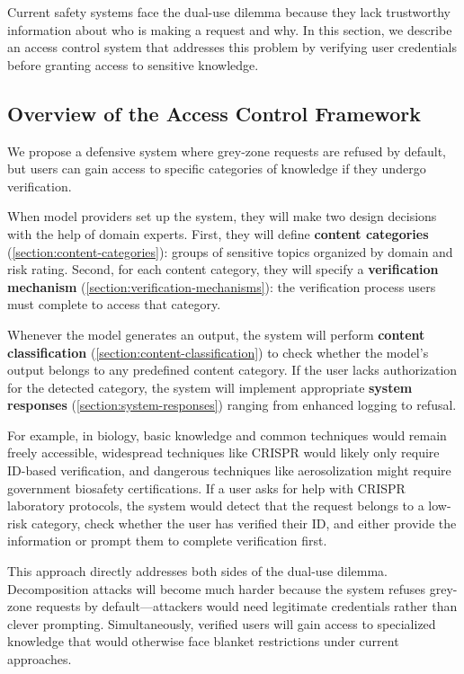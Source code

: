 \documentclass{article}
\theoremstyle{plain}
\theoremstyle{definition}
\theoremstyle{remark}
\begin{document}
Current safety systems face the dual-use dilemma because they lack trustworthy information about who is making a request and why.
In this section, we describe an access control system that addresses this problem by verifying user credentials before granting access to sensitive knowledge.

\subsection{Overview of the Access Control Framework} \label{section:access-control-overview}

We propose a defensive system where grey-zone requests are refused by default, but users can gain access to specific categories of knowledge if they undergo verification.

When model providers set up the system, they will make two design decisions with the help of domain experts.
First, they will define \textbf{content categories} (\cref{section:content-categories}): groups of sensitive topics organized by domain and risk rating.
Second, for each content category, they will specify a \textbf{verification mechanism} (\cref{section:verification-mechanisms}): the verification process users must complete to access that category.

Whenever the model generates an output, the system will perform \textbf{content classification} (\cref{section:content-classification}) to check whether the model's output belongs to any predefined content category.
If the user lacks authorization for the detected category, the system will implement appropriate \textbf{system responses} (\cref{section:system-responses}) ranging from enhanced logging to refusal.

For example, in biology, basic knowledge and common techniques would remain freely accessible, widespread techniques like CRISPR would likely only require ID-based verification, and dangerous techniques like aerosolization might require government biosafety certifications.
If a user asks for help with CRISPR laboratory protocols, the system would detect that the request belongs to a low-risk category, check whether the user has verified their ID, and either provide the information or prompt them to complete verification first.

This approach directly addresses both sides of the dual-use dilemma.
Decomposition attacks will become much harder because the system refuses grey-zone requests by default—attackers would need legitimate credentials rather than clever prompting.
Simultaneously, verified users will gain access to specialized knowledge that would otherwise face blanket restrictions under current approaches.
\end{document}
